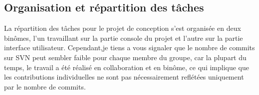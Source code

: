     
   
    
  

    
   

\subsection{Organisation et répartition des tâches}


La répartition des tâches pour le projet de conception s'est organisée en deux binômes, l'un travaillant sur la partie console du projet et l'autre sur la partie interface utilisateur. Cependant,je tiens a vous signaler que le nombre de commits sur SVN peut sembler faible pour chaque membre du groupe, car la plupart du temps, le travail a été réalisé en collaboration et en binôme, ce qui implique que les contributions individuelles ne sont pas nécessairement reflétées uniquement par le nombre de commits.